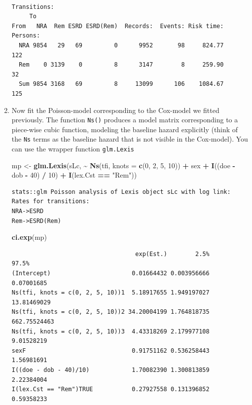 \documentclass[
]{book}
\newenvironment{Shaded}{\begin{snugshade}}{\end{snugshade}}
\newcommand{\AttributeTok}[1]{\textcolor[rgb]{0.13,0.29,0.53}{#1}}
\newcommand{\DecValTok}[1]{\textcolor[rgb]{0.00,0.00,0.81}{#1}}
\newcommand{\FunctionTok}[1]{\textcolor[rgb]{0.13,0.29,0.53}{\textbf{#1}}}
\newcommand{\NormalTok}[1]{#1}
\newcommand{\OtherTok}[1]{\textcolor[rgb]{0.56,0.35,0.01}{#1}}
\newcommand{\SpecialCharTok}[1]{\textcolor[rgb]{0.81,0.36,0.00}{\textbf{#1}}}
\newcommand{\StringTok}[1]{\textcolor[rgb]{0.31,0.60,0.02}{#1}}
\begin{document}
\begin{enumerate}
\begin{verbatim}

Transitions:
     To
From   NRA  Rem ESRD ESRD(Rem)  Records:  Events: Risk time:  Persons:
  NRA 9854   29   69         0      9952       98     824.77       122
  Rem    0 3139    0         8      3147        8     259.90        32
  Sum 9854 3168   69         8     13099      106    1084.67       125
\end{verbatim}
\item
  Now fit the Poisson-model corresponding to the Cox-model
  we fitted previously. The function \texttt{Ns()} produces a model
  matrix corresponding to a piece-wise cubic function, modeling the
  baseline hazard explicitly (think of the \texttt{Ns} terms as the
  baseline hazard that is not visible in the Cox-model). You
  can use the wrapper function \texttt{glm.Lexis}

\begin{Shaded}
\begin{Highlighting}[]
\NormalTok{mp }\OtherTok{\textless{}{-}} \FunctionTok{glm.Lexis}\NormalTok{(sLc, }
                \SpecialCharTok{\textasciitilde{}} \FunctionTok{Ns}\NormalTok{(tfi, }\AttributeTok{knots =} \FunctionTok{c}\NormalTok{(}\DecValTok{0}\NormalTok{, }\DecValTok{2}\NormalTok{, }\DecValTok{5}\NormalTok{, }\DecValTok{10}\NormalTok{)) }\SpecialCharTok{+}
\NormalTok{                  sex }\SpecialCharTok{+} \FunctionTok{I}\NormalTok{((doe }\SpecialCharTok{{-}}\NormalTok{ dob }\SpecialCharTok{{-}} \DecValTok{40}\NormalTok{) }\SpecialCharTok{/} \DecValTok{10}\NormalTok{) }\SpecialCharTok{+} 
                  \FunctionTok{I}\NormalTok{(lex.Cst }\SpecialCharTok{==} \StringTok{"Rem"}\NormalTok{))}
\end{Highlighting}
\end{Shaded}

\begin{verbatim}
stats::glm Poisson analysis of Lexis object sLc with log link:
Rates for transitions:
NRA->ESRD
Rem->ESRD(Rem)
\end{verbatim}

\begin{Shaded}
\begin{Highlighting}[]
\FunctionTok{ci.exp}\NormalTok{(mp)}
\end{Highlighting}
\end{Shaded}

\begin{verbatim}
                                   exp(Est.)        2.5%        97.5%
(Intercept)                       0.01664432 0.003956666   0.07001685
Ns(tfi, knots = c(0, 2, 5, 10))1  5.18917655 1.949197027  13.81469029
Ns(tfi, knots = c(0, 2, 5, 10))2 34.20004199 1.764818735 662.75524463
Ns(tfi, knots = c(0, 2, 5, 10))3  4.43318269 2.179977108   9.01528219
sexF                              0.91751162 0.536258443   1.56981691
I((doe - dob - 40)/10)            1.70082390 1.300813859   2.22384004
I(lex.Cst == "Rem")TRUE           0.27927558 0.131396852   0.59358233
\end{verbatim}


\end{enumerate}
\end{document}
